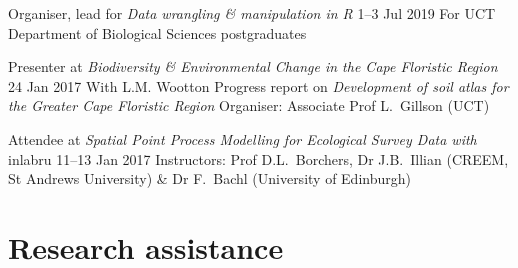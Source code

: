 \documentclass[10pt]{article}
\begin{document}
\begin{hangparas}{2em}{1}

Organiser, lead for \textit{Data wrangling \& manipulation in R}
                                                     \hfill 1--3 Jul 2019 \break
For UCT Department of Biological Sciences postgraduates

Presenter at \textit{Biodiversity \& Environmental Change in the Cape 
Floristic Region}                                      \hfill 24 Jan 2017 \break
With L.M. Wootton                                                         \break
Progress report on \textit{Development of soil atlas for the 
Greater Cape Floristic Region}                                            \break
Organiser: Associate Prof L.~Gillson (UCT)

Attendee at \textit{Spatial Point Process Modelling for Ecological 
Survey Data with} inlabru                          \hfill 11--13 Jan 2017 \break
Instructors:
  Prof D.L.~Borchers,
  Dr J.B.~Illian (CREEM, St Andrews University)                           \break
  \& Dr F.~Bachl (University of Edinburgh)

\hfill

\end{hangparas}

\section*{Research assistance} %
\end{document}
